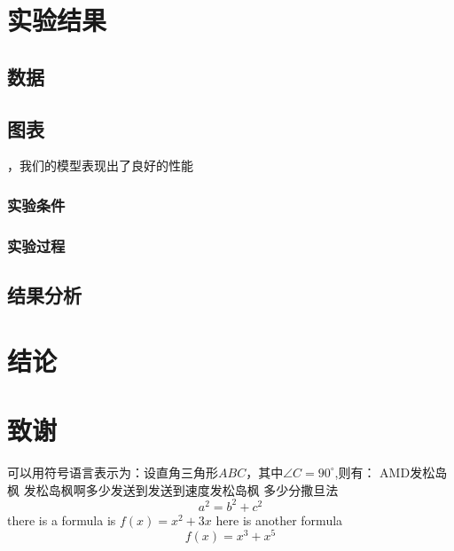 \documentclass{article}%
\newcommand\degree{^\circ}
\begin{document}
    \section{实验结果}
    \subsection{数据}
    \subsection{图表}
   ，我们的模型表现出了良好的性能
    \subsubsection{实验条件}
    \subsubsection{实验过程}
    \subsection{结果分析}
    \section{结论}
    \section{致谢}
    可以用符号语言表示为：设直角三角形$ABC$，其中$\angle C=90\degree$,则有：
    AMD发松岛枫
        发松岛枫啊多少发送到发送到速度发松岛枫
    多少分撒旦法
    \begin{equation}
    a^2=b^2+c^2
    \end{equation}
    there is a formula is $f(x)=x^2+3x$
    here is another formula $$f(x)=x^3+x^5$$
\end{document}
